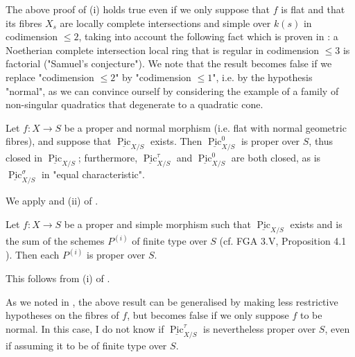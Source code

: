 \begin{remark}\label{fga3.vi-2-remark-2.2}
    The above proof of (i) holds true even if we only suppose that $f$ is flat and that its fibres $X_s$ are locally complete intersections and simple over $k(s)$ in codimension $\leqslant2$, taking into account the following fact which is proven in \cite{Gro1960b}: a Noetherian complete intersection local ring that is regular in codimension $\leqslant3$ is factorial ("Samuel's conjecture").
    We note that the result becomes false if we replace "codimension $\leqslant2$" by "codimension $\leqslant1$", i.e. by the hypothesis "normal", as we can convince ourself by considering the example of a family of non-singular quadratics that degenerate to a quadratic cone.
\end{remark}

\begin{corollary}\label{fga3.vi-2-corollary-2.3}
    Let $f\colon X\to S$ be a proper and normal morphism (i.e. flat with normal geometric fibres), and suppose that $\underline{\operatorname{Pic}}_{X/S}$ exists.
    Then $\underline{\operatorname{Pic}}_{X/S}^0$ is proper over $S$, thus closed in $\underline{\operatorname{Pic}}_{X/S}$;
    furthermore, $\underline{\operatorname{Pic}}_{X/S}^\tau$ and $\underline{\operatorname{Pic}}_{X/S}^0$ are both closed, as is $\underline{\operatorname{Pic}}_{X/S}^\sigma$ in "equal characteristic".
\end{corollary}

\begin{cproof}
    We apply  and (ii) of .
\end{cproof}

\begin{corollary}\label{fga3.vi-2-corollary-2.4}
    Let $f\colon X\to S$ be a proper and simple morphism such that $\underline{\operatorname{Pic}}_{X/S}$ exists and is the sum of the schemes $P^{(i)}$ of finite type over $S$ (cf. FGA 3.V, Proposition 4.1 ).
    Then each $P^{(i)}$ is proper over $S$.
\end{corollary}

\begin{cproof}
    This follows from (i) of .
\end{cproof}


As we noted in , the above result can be generalised by making less restrictive hypotheses on the fibres of $f$, but becomes false if we only suppose $f$ to be normal.
In this case, I do not know if $\underline{\operatorname{Pic}}_{X/S}^\tau$ is nevertheless proper over $S$, even if assuming it to be of finite type over $S$.


